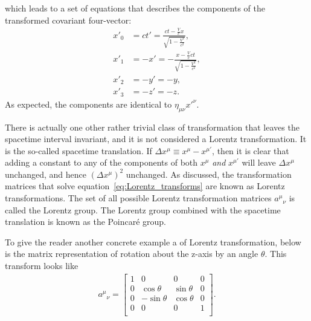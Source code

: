 \documentclass[titlepage,letterpaper,onecolumn,11pt,final]{report}
\numberwithin{equation}{section}
\numberwithin{figure}{section}
\begin{document}
%
which leads to a set of equations that describes the components of the transformed covariant four-vector:
\begin{subequations}
\begin{align}
 {x'}_{0} &= ct'= \frac{ct - \frac{V}{c}x}{\sqrt{1-\frac{V^2}{c^2}}}, \\
 {x'}_{1} &= -x' = -\frac{x - \frac{V}{c}ct}{\sqrt{1-\frac{V^2}{c^2}}}, \\
 {x'}_{2} &= -y' = -y, \\
 {x'}_{3} &= -z' = -z.
\end{align}
\end{subequations}
As expected, the components are identical to $\eta_{\mu \nu} {x'}^{\nu}$.

There is actually one other rather trivial class of transformation that leaves the spacetime interval invariant, and it is not considered a Lorentz transformation. It is the so-called spacetime translation. If $\Delta x^{\mu} \equiv x^{\mu} - x^{\mu'}$, then it is clear that adding a constant to any of the components of both $x^{\mu}$ \emph{and} $x^{\mu'}$ will leave $\Delta x^{\mu}$ unchanged, and hence $(\Delta x^{\mu})^{2}$ unchanged. As discussed, the transformation matrices that solve equation~\ref{eq:Lorentz_transforms} are known as Lorentz transformations. The set of all possible Lorentz transformation matrices ${a^{\mu}}_{\nu}$ is called the Lorentz group. The Lorentz group combined with the spacetime translation is known as the Poincar\'{e} group. 

To give the reader another concrete example a of Lorentz transformation, below is the matrix representation of rotation about the z-axis by an angle $\theta$. This transform looks like
\begin{gather}
	\label{eq:Lorentz_rotation}
	{a^{\mu}}_{\nu} =
	\begin{bmatrix}
		1  & 0             & 0             & 0 \\
		0  & \cos \theta & \sin \theta & 0 \\
		0  &-\sin \theta & \cos \theta & 0 \\
		0  & 0             & 0             & 1 \\
	\end{bmatrix}
	.
\end{gather}
\end{document}
